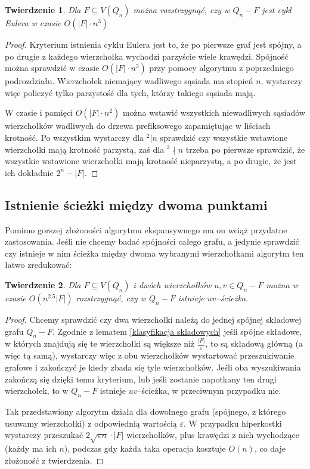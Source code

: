 \documentclass{pracamgr}
\newtheorem{theorem}{Twierdzenie}[chapter]
\begin{document}
    \begin{theorem}\label{cykl Eulera}
     Dla $F\subseteq V(Q_n)$ można rozstrzygnąć, czy w $Q_n-F$ jest cykl Eulera w czasie $O(|F|\cdot n^3)$
    \end{theorem}
    \begin{proof}
     Kryterium istnienia cyklu Eulera jest to, że po pierwsze graf jest spójny, a po drugie z każdego wierzchołka wychodzi parzyście wiele krawędzi.
     Spójność można sprawdzić w czasie $O(|F|\cdot n^3)$ przy pomocy algorytmu z poprzedniego podrozdziału.
     Wierzchołek niemający wadliwego sąsiada ma stopień $n$, wystarczy więc policzyć tylko parzystość dla tych, którzy takiego sąsiada mają.
     
     W czasie i pamięci $O(|F|\cdot n^2)$ można wstawić wszystkich niewadliwych sąsiadów wierzchołków wadliwych
     do drzewa prefiksowego zapamiętując w liściach krotność.
     Po wszystkim wystarczy dla $^2|n$ sprawdzić czy wszystkie wstawione wierzchołki mają krotność parzystą, zaś dla $^2\nmid n$ trzeba po pierwsze sprawdzić,
     że wszystkie wstawione wierzchołki mają krotność nieparzystą, a po drugie, że jest ich dokładnie $2^n-|F|$.
    \end{proof}
   \subsection{Istnienie ścieżki między dwoma punktami}
    Pomimo gorszej złożoności algorytmu ekspansywnego ma on wciąż przydatne zastosowania. Jeśli nie chcemy badać spójności całego grafu, a jedynie sprawdzić
    czy istnieje w nim ścieżka między dwoma wybranymi wierzchołkami algorytm ten łatwo zredukować:
    \begin{theorem}
     Dla $F\subseteq V(Q_n)$ i dwóch wierzchołków $u,v\in Q_n-F$ można w czasie $O(n^{2.5}|F|)$ rozstrzygnąć, czy w $Q_n-F$ istnieje $uv$--ścieżka.
    \end{theorem}
    \begin{proof}
     Chcemy sprawdzić czy dwa wierzchołki należą do jednej spójnej składowej grafu $Q_n-F$. Zgodnie z lematem \ref{klasyfikacja skladowych}
     jeśli spójne składowe, w których znajdują się te wierzchołki są większe niż $\frac{|F|}{\varepsilon}$, to są składową główną (a więc tą samą),
     wystarczy więc z obu wierzchołków wystartować przeszukiwanie grafowe i zakończyć je kiedy zbada się tyle wierzchołków.
     Jeśli oba wyszukiwania zakończą się dzięki temu kryterium, lub jeśli zostanie napotkany ten drugi wierzchołek, to w $Q_n-F$ istnieje $uv$--ścieżka,
     w przeciwnym przypadku nie.
     
     Tak przedstawiony algorytm działa dla dowolnego grafu (spójnego, z którego usuwamy wierzchołki)
     z odpowiednią wartością $\varepsilon$. W przypadku hiperkostki wystarczy przeszukać $2\sqrt{\pi n}\cdot|F|$ wierzchołków,
     plus krawędzi z nich wychodzące (każdy ma ich $n$),
     podczas gdy każda taka operacja kosztuje $O(n)$, co daje złożoność z twierdzenia.
    \end{proof}    
\end{document}
